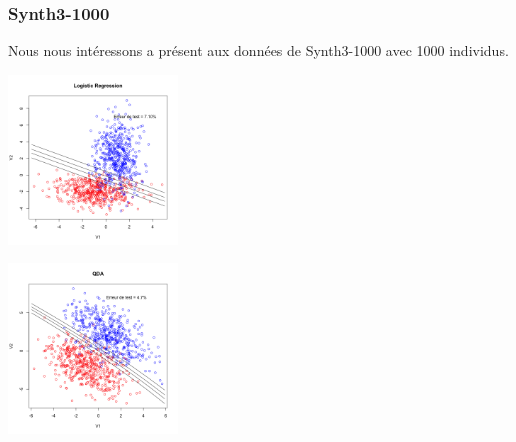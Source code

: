 \documentclass[10pt]{article}
\begin{document}
\subsubsection{Synth3-1000}
Nous nous intéressons a présent aux données de Synth3-1000 avec 1000 individus.

\begin{minipage}{.5\textwidth}
	\includegraphics[width=45mm]{Figures/synth3_lda.png}
\end{minipage}%
\hspace{0.02\linewidth}
\begin{minipage}{.5\textwidth}
	\includegraphics[width=45mm]{Figures/synth3_qda.png}
\end{minipage}
\end{document}
